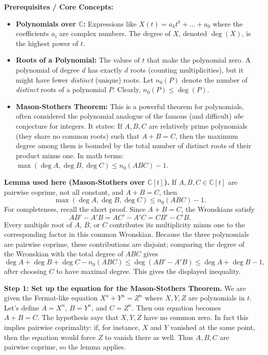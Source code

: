 \begin{solution}
\textbf{Prerequisites / Core Concepts:}
\begin{itemize}
    \item \textbf{Polynomials over $\mathbb{C}$:} Expressions like $X(t) = a_k t^k + \dots + a_0$ where the coefficients $a_i$ are complex numbers. The degree of $X$, denoted $\deg(X)$, is the highest power of $t$.
    \item \textbf{Roots of a Polynomial:} The values of $t$ that make the polynomial zero. A polynomial of degree $d$ has exactly $d$ roots (counting multiplicities), but it might have fewer \textit{distinct} (unique) roots. Let $n_0(P)$ denote the number of \textit{distinct} roots of a polynomial $P$. Clearly, $n_0(P) \leq \deg(P)$.
    \item \textbf{Mason-Stothers Theorem:} This is a powerful theorem for polynomials, often considered the polynomial analogue of the famous (and difficult) $abc$ conjecture for integers. It states: If $A, B, C$ are relatively prime polynomials (they share no common roots) such that $A + B = C$, then the maximum degree among them is bounded by the total number of distinct roots of their product minus one. In math terms: $\max(\deg A, \deg B, \deg C) \leq n_0(ABC) - 1$.
\end{itemize}

\textbf{Lemma used here (Mason-Stothers over $\mathbb{C}[t]$).}
If $A,B,C\in \mathbb{C}[t]$ are pairwise coprime, not all constant, and $A+B=C$, then
\[
\max(\deg A,\deg B,\deg C)\leq n_0(ABC)-1.
\]
For completeness, recall the short proof. Since $A+B=C$, the Wronskians satisfy
\[
AB'-A'B=AC'-A'C=CB'-C'B.
\]
Every multiple root of $A$, $B$, or $C$ contributes its multiplicity minus one to the corresponding factor in this common Wronskian. Because the three polynomials are pairwise coprime, these contributions are disjoint; comparing the degree of the Wronskian with the total degree of $ABC$ gives
\[
\deg A+\deg B+\deg C-n_0(ABC)\leq \deg(AB'-A'B)\leq \deg A+\deg B-1,
\]
after choosing $C$ to have maximal degree. This gives the displayed inequality.

\textbf{Step 1: Set up the equation for the Mason-Stothers Theorem.}
We are given the Fermat-like equation $X^n + Y^n = Z^n$ where $X, Y, Z$ are polynomials in $t$.
Let's define $A = X^n$, $B = Y^n$, and $C = Z^n$. Then our equation becomes $A + B = C$.
The hypothesis says that $X,Y,Z$ have no common zero. In fact this implies pairwise coprimality: if, for instance, $X$ and $Y$ vanished at the same point, then the equation would force $Z$ to vanish there as well. Thus $A,B,C$ are pairwise coprime, so the lemma applies.


\end{solution}
